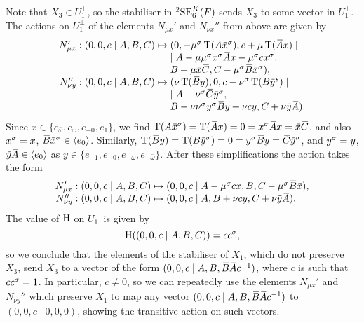 Note that $X_3 \in U_1^{\perp}$, so the stabiliser in 
${}^2\mathrm{SE}_6^K(F)$ sends $X_3$ to some vector
in $U_1^{\perp}$. 
The actions on $U_1^{\perp}$ of the elements $N_{\mu x}'$ and $N_{\nu x}''$ from above are given
by
\begin{equation}
	\begin{array}{r@{\;}c@{\;}l}
		N_{\mu x}' : (0,0,c\mid A,B,C) & \mapsto & 
			(0,-\mu^{\s}\Tr(A\ovx^{\s}), c+\mu\Tr(\ovA x) \mid \\
		& & \mid A - \mu\mu^{\s} x^{\s} \ovA x - \mu^{\s} c x^{\s}, \\
		& &		 B + \mu\ovx\ovC, C - \mu^{\s} \ovB \ovx^{\s}), \\
				 
		N_{\nu y}'' : (0,0,c\mid A,B,C) & \mapsto & 
			(\nu\Tr(\ovB y), 0, c-\nu^{\s}\Tr(B\ovy^{s}) \mid \\
		& & \mid A - \nu^{\s}\ovC\ovy^{\s}, \\
		& & B - \nu\nu^{\s} y^{\s}\ovB y + \nu c y, C + \nu\ovy\ovA). 
	\end{array}
\end{equation}
Since $x \in \{e_{\bar{\omega}}, e_{\omega}, e_{-0}, e_1\}$, we find $\Tr(A\ovx^{\s}) = 
\Tr(\ovA x) = 0 = x^{\s} \ovA x = \ovx \ovC$, and also $x^{\sigma} = x$, $\ovB \ovx^{\s} \in 
\langle e_0 \rangle$. Similarly, $\Tr(\ovB y) = \Tr(B\ovy^{\s}) = 0 = y^{\s} \ovB y = \ovC \ovy^{\s}$,
and $y^{\sigma} = y$, $\ovy \ovA \in \langle e_0 \rangle$ as $y \in \{ e_{-1}, e_{-0}, e_{-\omega}, 
e_{-\bar{\omega}} \}$. After these simplifications the action takes the form
\begin{equation}
	\begin{array}{r@{\;}c@{\;}l}
		N_{\mu x}' : (0,0,c\mid A,B,C) & \mapsto &
			(0,0,c\mid A  - \mu^{\s} c x, B, C - \mu^{\s}\ovB\ovx ), \\
		
		N_{\nu y}'' : (0,0,c\mid A,B,C) & \mapsto &
			(0,0,c\mid A, B + \nu c y, C + \nu \ovy \ovA).
	\end{array}
\end{equation}
The value of $\mathrm{H}$ on $U_1^{\perp}$ is given by
\begin{equation}
	\mathrm{H}((0,0,c\mid A,B,C)) = c c^{\sigma},
\end{equation}
so we conclude that the elements of the stabiliser of $X_1$, 
which do not preserve $X_3$, 
send $X_3$ to a vector of the form $(0,0,c\mid A,B, \ovB \ovA 
c^{-1})$, where $c$ is such that $c c^{\sigma} = 1$. In particular,
$c \neq 0$, so we can repeatedly use the elements $N_{\mu x}'$
and $N_{\nu y}''$ which preserve $X_1$ to map any vector
$(0,0,c\mid A,B, \ovB \ovA c^{-1})$ to $(0,0,c \mid 0,0,0)$,
showing the transitive action on such vectors.


